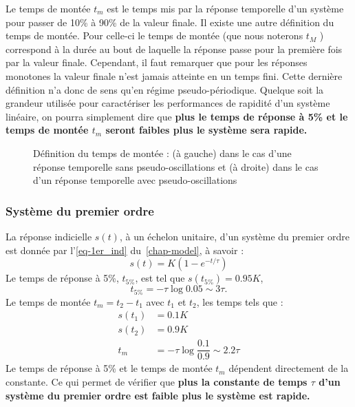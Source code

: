 Le temps de montée $t_m$ est le temps mis par la réponse temporelle d'un 
système pour passer de 10\% à 90\% de la valeur finale. Il existe une autre 
définition du temps de montée. Pour celle-ci le temps de montée (que nous 
noterons $t_{M}$ ) correspond à la durée au bout de laquelle la 
réponse passe pour la première fois par la valeur finale. Cependant, 
il faut remarquer que pour les réponses monotones la valeur finale n'est 
jamais atteinte en un temps fini. Cette dernière définition
n'a donc de sens qu'en régime pseudo-périodique.
Quelque soit la grandeur utilisée pour caractériser les performances de rapidité
d'un système linéaire, on pourra simplement dire que 
\textbf{plus le temps de réponse à 5\% et le temps de montée $t_m$ seront 
faibles plus le système sera rapide.}
\begin{figure}[!h]
    \centering
    
    
    \caption{Définition du temps de montée : (à gauche) dans le cas
             d'une réponse temporelle sans pseudo-oscillations et (à droite) 
             dans le cas d'un réponse temporelle avec pseudo-oscillations}
\end{figure}
\subsubsection{Système du premier ordre}
La réponse indicielle $s(t)$, à un échelon unitaire, 
d'un système du premier ordre est donnée par l'\cref{eq-1er_ind} 
du~\cref{chap-model}, à savoir :
\[
s(t)=K\left(1-e^{-t/\tau}\right)
\]
Le temps de réponse à 5\%, $t_{5\%}$, est tel que $s(t_{5\%})=0.95K$, 
\[
t_{5\%}=-\tau\log{0.05}\sim3\tau.
\]
Le temps de montée $t_m=t_2-t_1$ avec $t_1$ et $t_2$, les temps tels que :
\begin{align*}
    s(t_1)&=0.1K\\
    s(t_2)&=0.9K\\
    t_m   &=-\tau\log{\dfrac{0.1}{0.9}}\sim2.2\tau
\end{align*}
Le temps de réponse à 5\% et le temps de montée $t_m$ dépendent 
directement de la constante. Ce qui permet de vérifier que 
\textbf{plus la constante de temps $\tau$ d'un système du premier
ordre est faible plus le système est rapide.}
